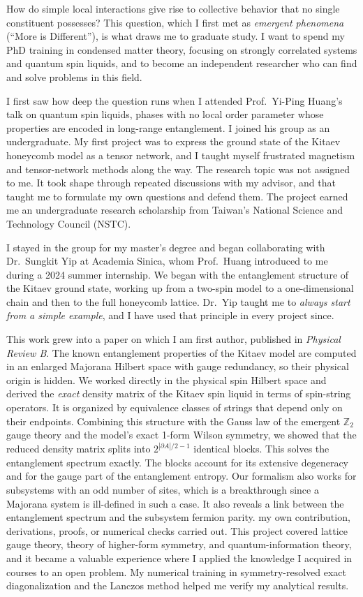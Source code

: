 How do simple local interactions give rise to collective behavior that no single constituent possesses? This question, which I first met as \textit{emergent phenomena} (``More is Different''), is what draws me to graduate study. I want to spend my PhD training in condensed matter theory, focusing on strongly correlated systems and quantum spin liquids, and to become an independent researcher who can find and solve problems in this field.

I first saw how deep the question runs when I attended Prof.~Yi-Ping Huang's talk on quantum spin liquids, phases with no local order parameter whose properties are encoded in long-range entanglement. I joined his group as an undergraduate. My first project was to express the ground state of the Kitaev honeycomb model as a tensor network, and I taught myself frustrated magnetism and tensor-network methods along the way. The research topic was not assigned to me. It took shape through repeated discussions with my advisor, and that taught me to formulate my own questions and defend them. The project earned me an undergraduate research scholarship from Taiwan's National Science and Technology Council (NSTC).

I stayed in the group for my master's degree and began collaborating with Dr.~Sungkit Yip at Academia Sinica, whom Prof.~Huang introduced to me during a 2024 summer internship. We began with the entanglement structure of the Kitaev ground state, working up from a two-spin model to a one-dimensional chain and then to the full honeycomb lattice. Dr.~Yip taught me to \textit{always start from a simple example}, and I have used that principle in every project since.

This work grew into a paper on which I am first author, published in \textit{Physical Review B}. The known entanglement properties of the Kitaev model are computed in an enlarged Majorana Hilbert space with gauge redundancy, so their physical origin is hidden. We worked directly in the physical spin Hilbert space and derived the \textit{exact} density matrix of the Kitaev spin liquid in terms of spin-string operators. It is organized by equivalence classes of strings that depend only on their endpoints. Combining this structure with the Gauss law of the emergent $\mathbb{Z}_2$ gauge theory and the model's exact 1-form Wilson symmetry, we showed that the reduced density matrix splits into $2^{|\partial A|/2-1}$ identical blocks. This solves the entanglement spectrum exactly. The blocks account for its extensive degeneracy and for the gauge part of the entanglement entropy. Our formalism also works for subsystems with an odd number of sites, which is a breakthrough since a Majorana system is ill-defined in such a case. It also reveals a link between the entanglement spectrum and the subsystem fermion parity. {\color{red} my own contribution, derivations, proofs, or numerical checks carried out.} This project covered lattice gauge theory, theory of higher-form symmetry, and quantum-information theory, and it became a valuable experience where I applied the knowledge I acquired in courses to an open problem. My numerical training in symmetry-resolved exact diagonalization and the Lanczos method helped me verify my analytical results.

